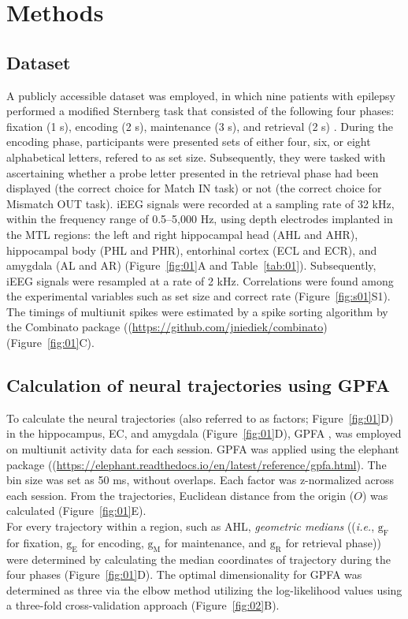 \section{Methods}
\subsection{Dataset}
A publicly accessible dataset \cite{boran_dataset_2020} was employed, in which nine patients with epilepsy performed a modified Sternberg task that consisted of the following four phases: fixation (1 s), encoding (2 s), maintenance (3 s), and retrieval (2 s) \cite{boran_dataset_2020}. During the encoding phase, participants were presented sets of either four, six, or eight alphabetical letters, refered to as set size. Subsequently, they were tasked with ascertaining whether a probe letter presented in the retrieval phase had been displayed (the correct choice for Match IN task) or not (the correct choice for Mismatch OUT task). iEEG signals were recorded at a sampling rate of 32 kHz, within the frequency range of 0.5--5,000 Hz, using depth electrodes implanted in the MTL regions: the left and right hippocampal head (AHL and AHR), hippocampal body (PHL and PHR), entorhinal cortex (ECL and ECR), and amygdala (AL and AR) (Figure~\ref{fig:01}A and Table~\ref{tab:01}). Subsequently, iEEG signals were resampled at a rate of 2 kHz. Correlations were found among the experimental variables such as set size and correct rate (Figure~\ref{fig:s01}S1). The timings of multiunit spikes were estimated by a spike sorting algorithm \cite{niediek_reliable_2016} by the Combinato package ((\url{https://github.com/jniediek/combinato})(Figure~\ref{fig:01}C).

\subsection{Calculation of neural trajectories using GPFA}
To calculate the neural trajectories (also referred to as factors; Figure~\ref{fig:01}D) in the hippocampus, EC, and amygdala (Figure~\ref{fig:01}D), GPFA \cite{yu_gaussian-process_2009}, was employed on multiunit activity data for each session. GPFA was applied using the elephant package ((\url{https://elephant.readthedocs.io/en/latest/reference/gpfa.html}). The bin size was set as 50 ms, without overlaps. Each factor was z-normalized across each session. From the trajectories, Euclidean distance from the origin ($O$) was calculated (Figure~\ref{fig:01}E).
\\
\indent
For every trajectory within a region, such as AHL, \textit{geometric medians} ((\textit{i.e.}, $\mathrm{g_{F}}$ for fixation, $\mathrm{g_{E}}$ for encoding, $\mathrm{g_{M}}$ for maintenance, and $\mathrm{g_{R}}$ for retrieval phase)) were determined by calculating the median coordinates of trajectory during the four phases (Figure~\ref{fig:01}D). The optimal dimensionality for GPFA was determined as three via the elbow method utilizing the log-likelihood values using a three-fold cross-validation approach (Figure~\ref{fig:02}B).

